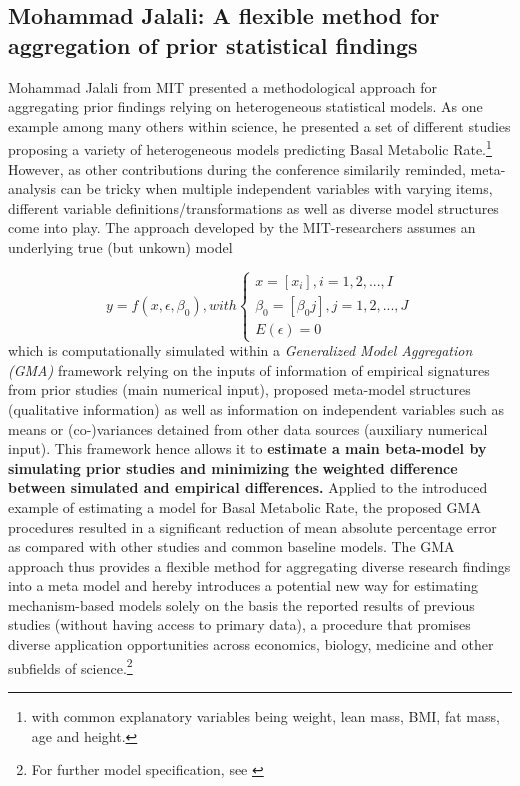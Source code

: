 \documentclass[a4paper,man,natbib]{apa6}
\begin{document}
\subsection{Mohammad Jalali: A flexible method for aggregation of prior statistical findings}

Mohammad Jalali from MIT presented a methodological approach for aggregating prior findings relying on heterogeneous statistical models. As one example among many others within science, he presented a set of different studies proposing a variety of heterogeneous models predicting Basal Metabolic Rate.\footnote[4]{with common explanatory variables being weight, lean mass, BMI, fat mass, age and height.} 
However, as other contributions during the conference similarily reminded, meta-analysis can be tricky when multiple independent variables with varying items, different variable definitions/transformations as well as diverse model structures  come into play. The approach developed by the MIT-researchers assumes an underlying true (but unkown) model 

\begin{equation}
y = f(x,\epsilon,\beta_0), with \left\{
\begin{array}{ll}
x = [x_i], i = 1,2,...,I\\
\beta_0 = [\beta_0j], j = 1,2,...,J\\
E(\epsilon) = 0
\end{array}
\right.
\end{equation}
which is computationally simulated within a \textit{Generalized Model Aggregation (GMA)} framework relying on the inputs of information of empirical signatures from prior studies (main numerical input), proposed meta-model structures (qualitative information) as well as information on independent variables such as means or (co-)variances detained from other data sources (auxiliary numerical input). This framework hence allows it to \textbf{estimate a main beta-model by simulating prior studies and minimizing the weighted difference between simulated and empirical differences.} Applied to the introduced example of estimating a model for Basal Metabolic Rate, the proposed GMA procedures resulted in a significant reduction of mean absolute percentage error as compared with other studies and common baseline models. The GMA approach thus provides a flexible method for aggregating diverse research findings into a meta model and hereby introduces a potential new way for estimating mechanism-based models solely on the basis the reported results of previous studies (without having access to primary data), a procedure that promises diverse application opportunities across economics, biology, medicine and other subfields of science.\footnote[5]{For further model specification, see \cite{Rahmandad2017}}
\end{document}
